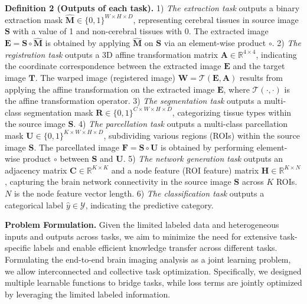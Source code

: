 \noindent \textbf{Definition 2 (Outputs of each task).} 1) \textit{The extraction task} outputs a binary extraction mask $\hat{\mathbf{M}}\in \{0,1\}^{W \times H \times D}$, representing cerebral tissues in source image $\mathbf{S}$ with a value of 1 and non-cerebral tissues with 0. The extracted image $\mathbf{E} = \mathbf{S} \circ \hat{\mathbf{M}}$ is obtained by applying $\hat{\mathbf{M}}$ on $\mathbf{S}$ via an element-wise product $\circ$. 2) \textit{The registration task} outputs a 3D affine transformation matrix $\mathbf{A} \in \mathbb{R}^{4 \times 4}$,
indicating the coordinate correspondence between the extracted image $\mathbf{E}$ and the target image $\mathbf{T}$. The warped image (\ie registered image) $\mathbf{W} = \mathcal{T}\left(\mathbf{E},\mathbf{A}\right)$ results from applying the affine transformation on the extracted image $\mathbf{E}$, where $\mathcal{T}(\cdot, \cdot)$ is the affine transformation operator. 3) \textit{The segmentation task} outputs a multi-class segmentation mask $\mathbf{R} \in \{0,1\}^{C \times W \times H \times D}$, categorizing tissue types within the source image $\mathbf{S}$. 
4) \textit{The parcellation task} outputs a multi-class parcellation mask $\mathbf{U} \in \{0,1\}^{K \times W \times H \times D}$, subdividing various regions (ROIs) within the source image $\mathbf{S}$. The parcellated image $\mathbf{F} = \mathbf{S} \circ \mathbf{U}$ is obtained by performing element-wise product $\circ$ between $\mathbf{S}$ and $\mathbf{U}$.
5) \textit{The network generation task} outputs an adjacency matrix $\mathbf{C} \in \mathbb{R}^{K \times K}$ and a 
node feature (\ie ROI feature) matrix  $\mathbf{H} \in \mathbb{R}^{K \times N}$, capturing the brain network connectivity in the source image $\mathbf{S}$ across $K$ ROIs. $N$ is the node feature vector length. 6) \textit{The classification task} outputs a categorical label $\hat{y} \in \mathcal{Y}$, indicating the predictive category.

\noindent \textbf{Problem Formulation.}
Given the limited labeled data and heterogeneous inputs and outputs across tasks, we aim to minimize the need for extensive task-specific labels and enable efficient knowledge transfer across different tasks. Formulating the end-to-end brain imaging analysis as a joint learning problem, we allow interconnected and collective task optimization. Specifically, we designed multiple learnable functions to bridge tasks, while loss terms are jointly optimized by leveraging the limited labeled information. %


